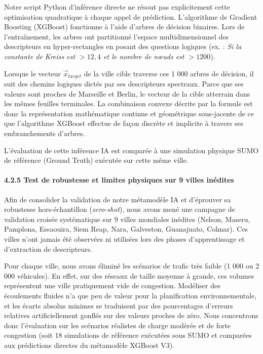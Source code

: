 \documentclass[10pt, a4paper]{article}
\begin{document}
Notre script Python d'inférence directe ne résout pas explicitement
cette optimisation quadratique à chaque appel de prédiction.
L'algorithme de Gradient Boosting (XGBoost) fonctionne à l'aide d'arbres
de décision binaires. Lors de l'entraînement, les arbres ont partitionné
l'espace multidimensionnel des descripteurs en hyper-rectangles en
posant des questions logiques (ex. : \emph{Si la constante de Kreiss est
\(> 12,4\) et le nombre de nœuds est \(> 1200\)}).

Lorsque le vecteur \(\vec{x}_{target}\) de la ville cible traverse ces 1
000 arbres de décision, il suit des chemins logiques dictés par ses
descripteurs spectraux. Parce que ses valeurs sont proches de Marseille
et Berlin, le vecteur de la cible atterrain dans les mêmes feuilles
terminales. La combinaison convexe décrite par la formule est donc la
représentation mathématique continue et géométrique sous-jacente de ce
que l'algorithme XGBoost effectue de façon discrète et implicite à
travers ses embranchements d'arbres.

L'évaluation de cette inférence IA est comparée à une simulation
physique SUMO de référence (Ground Truth) exécutée sur cette même ville.

\paragraph{4.2.5 Test de robustesse et limites physiques sur 9 villes
inédites}\label{test-de-robustesse-et-limites-physiques-sur-9-villes-inuxe9dites}

Afin de consolider la validation de notre métamodèle IA et d'éprouver sa
robustesse hors-échantillon (\emph{zero-shot}), nous avons mené une
campagne de validation croisée systématique sur 9 villes mondiales
inédites (Nelson, Maseru, Pamplona, Essaouira, Siem Reap, Nara,
Galveston, Guanajuato, Colmar). Ces villes n'ont jamais été observées ni
utilisées lors des phases d'apprentissage et d'extraction de
descripteurs.

Pour chaque ville, nous avons éliminé les scénarios de trafic très
faible (1 000 ou 2 000 véhicules). En effet, sur des réseaux de taille
moyenne à grande, ces volumes représentent une ville pratiquement vide
de congestion. Modéliser des écoulements fluides n'a que peu de valeur
pour la planification environnementale, et les écarts absolus minimes se
traduisent par des pourcentages d'erreurs relatives artificiellement
gonflés sur des valeurs proches de zéro. Nous concentrons donc
l'évaluation sur les scénarios réalistes de charge modérée et de forte
congestion (soit 18 simulations de référence exécutées sous SUMO et
comparées aux prédictions directes du métamodèle XGBoost V3).
\end{document}

